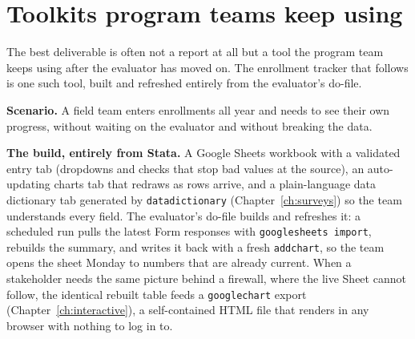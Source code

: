 \documentclass[
    a4paper,
    fontsize=10pt,
    twoside=true,
    numbers=noenddot,
]{kaobook}
\newcounter{appliedexample}
\newenvironment{appliedexample}[1][]{%
    \refstepcounter{appliedexample}%
    \begin{appliedexamplebox}[frametitle={Applied Example~\theappliedexample.~~#1}]%
}{%
    \end{appliedexamplebox}%
}
\begin{document}
\section{Toolkits program teams keep using}\label{sec:teamtoolkit}
The best deliverable is often not a report at all but a tool the program team keeps using after the evaluator has moved on. The enrollment tracker that follows is one such tool, built and refreshed entirely from the evaluator's do-file.

\begin{appliedexample}[An enrollment tracker the field team keeps]\label{ae:ch11-tracker}
\textbf{Scenario.} A field team enters enrollments all year and needs to see their own progress, without waiting on the evaluator and without breaking the data.

\medskip
\textbf{The build, entirely from Stata.} A Google Sheets workbook with a validated entry tab (dropdowns and checks that stop bad values at the source), an auto-updating charts tab that redraws as rows arrive, and a plain-language data dictionary tab generated by \texttt{datadictionary} (Chapter~\ref{ch:surveys}) so the team understands every field. The evaluator's do-file builds and refreshes it: a scheduled run pulls the latest Form responses with \texttt{googlesheets import}, rebuilds the summary, and writes it back with a fresh \texttt{addchart}, so the team opens the sheet Monday to numbers that are already current. When a stakeholder needs the same picture behind a firewall, where the live Sheet cannot follow, the identical rebuilt table feeds a \texttt{googlechart} export (Chapter~\ref{ch:interactive}), a self-contained HTML file that renders in any browser with nothing to log in to.


\end{appliedexample}
\end{document}
